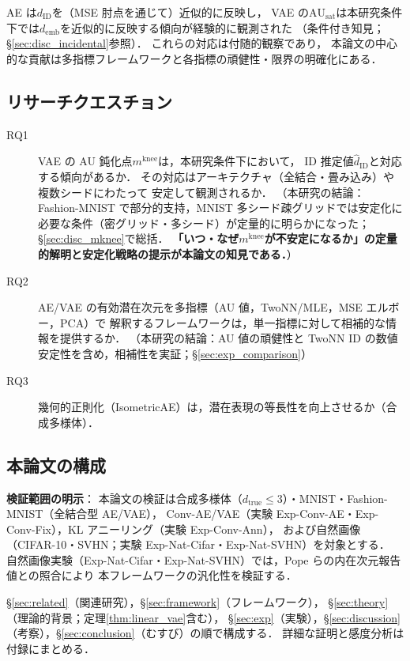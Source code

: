 \documentclass[11pt,a4paper]{jsarticle}
\newcommand{\dID}{d_{\mathrm{ID}}}
\newcommand{\AUsat}{\mathrm{AU}_{\mathrm{sat}}}
\newcommand{\mknee}{m^{\mathrm{knee}}}
\newcommand{\demb}{d_{\mathrm{emb}}}
\begin{document}
AE は$\dID$を（MSE 肘点を通じて）近似的に反映し，
VAE の$\AUsat$は本研究条件下では$\demb$を近似的に反映する傾向が経験的に観測された
（条件付き知見；§\ref{sec:disc_incidental}参照）．
これらの対応は付随的観察であり，
本論文の中心的な貢献は多指標フレームワークと各指標の頑健性・限界の明確化にある．

\subsection{リサーチクエスチョン}\label{sec:intro_rq}

\begin{description}
  \item[RQ1] VAE の AU 鈍化点$\mknee$は，本研究条件下において，
             ID 推定値$\hat{d}_\mathrm{ID}$と対応する傾向があるか．
             その対応はアーキテクチャ（全結合・畳み込み）や複数シードにわたって
             安定して観測されるか．
             （本研究の結論：Fashion-MNIST で部分的支持，MNIST 多シード疎グリッドでは安定化に必要な条件（密グリッド・多シード）が定量的に明らかになった；
             §\ref{sec:disc_mknee}で総括．
             \textbf{「いつ・なぜ$\mknee$が不安定になるか」の定量的解明と安定化戦略の提示が本論文の知見である．}）
  \item[RQ2] AE/VAE の有効潜在次元を多指標（AU 値，TwoNN/MLE，MSE エルボー，PCA）で
             解釈するフレームワークは，単一指標に対して相補的な情報を提供するか．
             （本研究の結論：AU 値の頑健性と TwoNN ID の数値安定性を含め，相補性を実証；§\ref{sec:exp_comparison}）
  \item[RQ3] 幾何的正則化（IsometricAE）は，潜在表現の等長性を向上させるか（合成多様体）．
\end{description}

\subsection{本論文の構成}\label{sec:intro_structure}

\textbf{検証範囲の明示}：
本論文の検証は合成多様体（$d_{\mathrm{true}} \leq 3$）・MNIST・Fashion-MNIST（全結合型 AE/VAE），
Conv-AE/VAE（実験 Exp-Conv-AE・Exp-Conv-Fix），KL アニーリング（実験 Exp-Conv-Ann），
および自然画像（CIFAR-10・SVHN；実験 Exp-Nat-Cifar・Exp-Nat-SVHN）を対象とする．
自然画像実験（Exp-Nat-Cifar・Exp-Nat-SVHN）では，Pope ら\cite{pope2021intrinsic}の内在次元報告値との照合により
本フレームワークの汎化性を検証する．

§\ref{sec:related}（関連研究），§\ref{sec:framework}（フレームワーク），
§\ref{sec:theory}（理論的背景；定理\ref{thm:linear_vae}含む），
§\ref{sec:exp}（実験），§\ref{sec:discussion}（考察），§\ref{sec:conclusion}（むすび）の順で構成する．
詳細な証明と感度分析は付録にまとめる．
\end{document}
